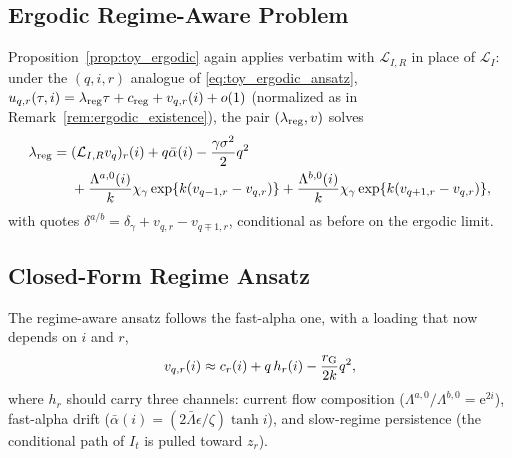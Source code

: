 \documentclass[11pt,a4paper]{article}
\newcommand{\Lcal}{\mathcal{L}}
\newcommand{\e}{\mathrm e}
\newcommand{\alphabar}{\bar\alpha}
\theoremstyle{plain}
\theoremstyle{definition}
\begin{document}
\subsection{Ergodic Regime-Aware Problem}

Proposition~\ref{prop:toy_ergodic} again applies verbatim with
\(\mathcal L_{I,R}\) in place of \(\Lcal_I\): under the \((q,i,r)\) analogue of
\eqref{eq:toy_ergodic_ansatz},
\(u_{q,r}(\tau,i)=\lambda_{\rm reg}\tau+c_{\rm reg}+v_{q,r}(i)+o(1)\)
(normalized as in Remark~\ref{rem:ergodic_existence}), the pair
\((\lambda_{\rm reg},v)\) solves
\begin{align}
\lambda_{\rm reg}
={}&
(\mathcal{L}_{I,R} v_q)_r(i)+q\alphabar(i)-\frac{\gamma\sigma^2}{2}q^2
\notag\\
&+\frac{\Lambda^{a,0}(i)}{k}\chi_\gamma\exp\{k(v_{q-1,r}-v_{q,r})\}
+\frac{\Lambda^{b,0}(i)}{k}\chi_\gamma\exp\{k(v_{q+1,r}-v_{q,r})\},
\label{eq:regime_ergodic_hjb}
\end{align}
with quotes \(\delta^{a/b}=\delta_\gamma+v_{q,r}-v_{q\mp1,r}\), conditional as
before on the ergodic limit.

\subsection{Closed-Form Regime Ansatz}

The regime-aware ansatz follows the fast-alpha one, with a loading that now
depends on \(i\) and \(r\),
\begin{equation}
v_{q,r}(i)\approx c_r(i)+q\,h_r(i)-\frac{r_{\rm G}}{2k}q^2 ,
\label{eq:regime_ansatz_value}
\end{equation}
where \(h_r\) should carry three channels: current flow composition
(\(\Lambda^{a,0}/\Lambda^{b,0}=\e^{2i}\)), fast-alpha drift
(\(\alphabar(i)=(2\bar\Lambda\epsilon/\zeta)\tanh i\)), and slow-regime
persistence (the conditional path of \(I_t\) is pulled toward \(z_r\)).
\end{document}
